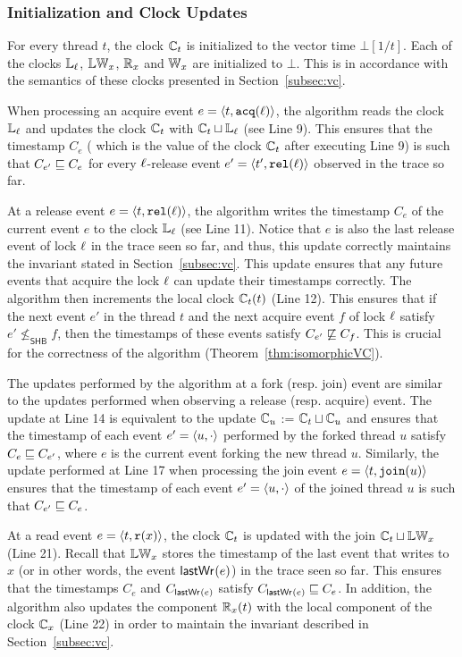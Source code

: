 \subsubsection{Initialization and Clock Updates}

For every thread $t$, the clock $\mathbb{C}_t$ 
is initialized to the vector time $\bot[1/t]$.
Each of the clocks $\mathbb{L}_\ell$, $\mathbb{LW}_x$, $\mathbb{R}_x$ and $\mathbb{W}_x$ are initialized to $\bot$. 
This is in accordance with the semantics of these clocks presented 
in Section~\ref{subsec:vc}.

When processing an acquire event $e = \langle t, \mathtt{acq}(\ell)\rangle$, the algorithm
reads the clock $\mathbb{L}_\ell$ and updates the clock $\mathbb{C}_t$ 
with $\mathbb{C}_t \sqcup \mathbb{L}_\ell$ (see Line 9).
This ensures that the timestamp $C_e$ (
which is the value of the clock $\mathbb{C}_t$ after executing Line 9) 
is such that $C_{e'} \sqsubseteq C_e$ for every $\ell$-release event $e' = \langle t', \mathtt{rel}(\ell)\rangle$
observed in the trace so far.

At a release event $e = \langle t, \mathtt{rel}(\ell)\rangle$,
the algorithm writes the timestamp
$C_e$ of the current event $e$
to the clock $\mathbb{L}_\ell$ (see Line 11).
Notice that $e$ is also
the last release event of lock $\ell$ in the trace seen so far,
and thus, this update correctly maintains the invariant
stated in Section~\ref{subsec:vc}.
This update ensures that any future events that 
acquire the lock $\ell$ can update their timestamps correctly.
The algorithm then increments the local clock $\mathbb{C}_t(t)$ (Line 12).
This ensures that if the next event $e'$ in the thread $t$ and the 
next acquire event $f$ of lock $\ell$ satisfy $e' \not\leq_\textsf{SHB} f$,
then the timestamps of these events satisfy $C_{e'} \not\sqsubseteq C_f$.
This is crucial for the correctness of the algorithm (Theorem~\ref{thm:isomorphicVC}).

The updates performed by the algorithm at a fork (resp. join)
event are similar to the updates performed when observing a release (resp. acquire) event.
The update at Line 14 is equivalent to the update 
$\mathbb{C}_u$ := $\mathbb{C}_t \sqcup \mathbb{C}_u$ and ensures that the
timestamp of each event $e' = \langle u, \cdot\rangle$ performed by the forked thread $u$
satisfy $C_e \sqsubseteq C_{e'}$, where $e$ is the current event forking the new thread $u$.
Similarly, the update performed at Line 17 when processing the join
event $e = \langle t, \mathtt{join}(u)\rangle$ ensures that the timestamp of
each event $e' = \langle u, \cdot\rangle$ of the joined thread $u$
is such that $C_{e'} \sqsubseteq C_e$.

At a read event $e = \langle t, \mathtt{r}(x)\rangle$, the clock $\mathbb{C}_t$ is updated with 
the join $\mathbb{C}_t \sqcup \mathbb{LW}_x$ (Line 21).
Recall that $\mathbb{LW}_x$ stores the timestamp of 
the last event that writes to $x$ (or in other words, the event $\mathsf{lastWr}_{}(e)$)
in the trace seen so far.
This ensures that the timestamps $C_e$ and $C_{\mathsf{lastWr}_{}(e)}$
satisfy $C_{\mathsf{lastWr}_{}(e)} \sqsubseteq C_e$.
In addition, the algorithm also updates the component $\mathbb{R}_x(t)$ with the 
local component of the clock
$\mathbb{C}_x$ (Line 22) in order to maintain the invariant described in Section~\ref{subsec:vc}.


